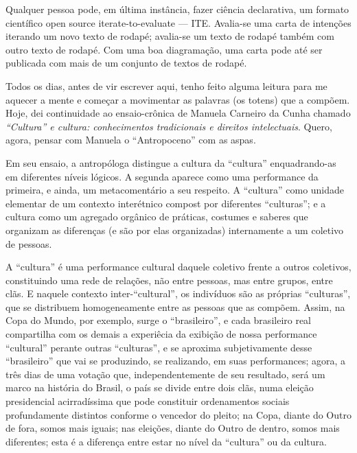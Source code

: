 Qualquer pessoa pode, em última instância, fazer ciência declarativa, um formato científico open source iterate-to-evaluate --- ITE. Avalia-se uma carta de intenções iterando um novo texto de rodapé; avalia-se um texto de rodapé também com outro texto de rodapé. Com uma boa diagramação, uma carta pode até ser publicada com mais de um conjunto de textos de rodapé.


Todos os dias, antes de vir escrever aqui, tenho feito alguma leitura para me aquecer a mente e começar a movimentar as palavras (os totens) que a compõem. Hoje, dei continuidade ao ensaio-crônica de Manuela Carneiro da Cunha chamado \textit{\enquote{Cultura} e cultura: conhecimentos tradicionais e direitos intelectuais}. Quero, agora, pensar com Manuela o \enquote{Antropoceno} com as aspas.

Em seu ensaio, a antropóloga distingue a cultura da \enquote{cultura} enquadrando-as em diferentes níveis lógicos. A segunda aparece como uma performance da primeira, e ainda, um metacomentário a seu respeito. A \enquote{cultura} como unidade elementar de um contexto interétnico compost por diferentes \enquote{culturas}; e a cultura como um agregado orgânico de práticas, costumes e saberes que organizam as diferenças (e são por elas organizadas) internamente a um coletivo de pessoas.

A \enquote{cultura} é uma performance cultural daquele coletivo frente a outros coletivos, constituindo uma rede de relações, não entre pessoas, mas entre grupos, entre clãs. E naquele contexto inter-\enquote{cultural}, os indivíduos são as próprias \enquote{culturas}, que se distribuem homogeneamente entre as pessoas que as compõem. Assim, na Copa do Mundo, por exemplo, surge o \enquote{brasileiro}, e cada brasileiro real compartilha com os demais a experiêcia da exibição de nossa performance \enquote{cultural} perante outras \enquote{culturas}, e se aproxima subjetivamente desse \enquote{brasileiro} que vai se produzindo, se realizando, em suas performances; agora, a três dias de uma votação que, independentemente de seu resultado, será um marco na história do Brasil, o país se divide entre dois clãs, numa eleição presidencial acirradíssima que pode constituir ordenamentos sociais profundamente distintos conforme o vencedor do pleito; na Copa, diante do Outro de fora, somos mais iguais; nas eleições, diante do Outro de dentro, somos mais diferentes; esta é a diferença entre estar no nível da \enquote{cultura} ou da cultura.


